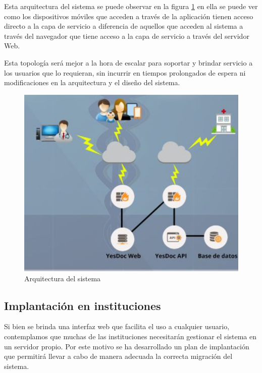 \documentclass[a4paper,12pt]{article}
\begin{document}
Esta arquitectura del sistema se puede observar en la figura \ref{arquitectura} en ella se puede ver como los dispositivos móviles que acceden a través de la aplicación tienen acceso directo a la capa de servicio a diferencia de aquellos que acceden al sistema a través del navegador que tiene acceso a la capa de servicio a través del servidor Web.

Esta topología será mejor a la hora de escalar para soportar y brindar servicio a los usuarios que lo requieran, sin incurrir en tiempos prolongados de espera ni modificaciones en la arquitectura y el diseño del sistema.


 \begin{figure}
  \centering
  \includegraphics[width=.8\textwidth]{img/esq_funcionamiento}
  \caption{Arquitectura del sistema}
  \label{arquitectura}
\end{figure}


\subsection{Implantación en instituciones}
Si bien se brinda una interfaz web que facilita el uso a cualquier usuario, contemplamos que muchas de las instituciones necesitarán gestionar el sistema en un servidor propio. Por este motivo se ha desarrollado un plan de implantación que permitirá llevar a cabo de manera adecuada la correcta migración del sistema.
\end{document}
